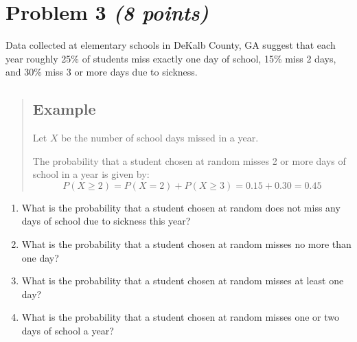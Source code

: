 \documentclass[11pt,twoside]{article}
\numberwithin{equation}{section}
\newcommand{\?}{\stackrel{?}{=}}
\newcommand{\bl}{\color{blue}}
\begin{document}
 
 \section*{Problem 3 \textit{(8 points)}}
Data collected at elementary schools in DeKalb County, GA suggest that each
year roughly 25\% of students miss exactly one day of school, 15\% miss 2 days, and 30\% miss 3 or more days
due to sickness.

\begin{quote}
    \subsection*{\bl Example}
    \bl   Let $X$ be the number of school days missed in a year.
    
    The probability that a student chosen at random misses 2 or more days of school in a year is given by:
    \begin{equation*}
      P(X \ge 2) = P(X=2) + P(X \ge 3) = 0.15 + 0.30 = 0.45
  \end{equation*}
\end{quote}

\begin{enumerate}[\bf (a)]
\item  What is the probability that a student chosen at random does not miss any days of school due to sickness
  this year?
 \vspace{25ex}
\item What is the probability that a student chosen at random misses no more than one day?
 \vspace{25ex}

\item What is the probability that a student chosen at random misses at least one day?
 \vspace{25ex}

 \item What is the probability that a student chosen at random misses one or two days of school a year?
 \vspace{25ex}

 

\end{enumerate}
\end{document}
